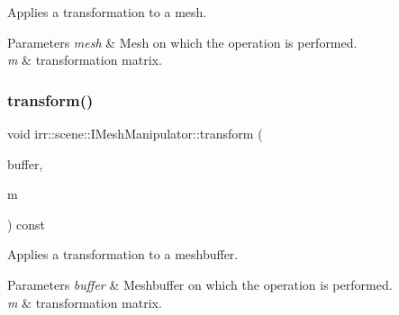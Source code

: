 Applies a transformation to a mesh. 


\begin{DoxyParams}{Parameters}
{\em mesh} & Mesh on which the operation is performed. \\
\hline
{\em m} & transformation matrix. \\
\hline
\end{DoxyParams}
\mbox{\label{classirr_1_1scene_1_1IMeshManipulator_a14dc2101f7facaddec49f59ed363bbc1}} 
\subsubsection{\texorpdfstring{transform()}{transform()}\hspace{0.1cm}{\footnotesize\ttfamily [2/2]}}
{\footnotesize\ttfamily void irr\+::scene\+::\+I\+Mesh\+Manipulator\+::transform (\begin{DoxyParamCaption}\item[{\hyperlink{classirr_1_1scene_1_1IMeshBuffer}{I\+Mesh\+Buffer} $\ast$}]{buffer,  }\item[{const \hyperlink{namespaceirr_1_1core_a73fa92e638c5ca97efd72da307cc9b65}{core\+::matrix4} \&}]{m }\end{DoxyParamCaption}) const\hspace{0.3cm}{\ttfamily [inline]}}



Applies a transformation to a meshbuffer. 


\begin{DoxyParams}{Parameters}
{\em buffer} & Meshbuffer on which the operation is performed. \\
\hline
{\em m} & transformation matrix. \\
\hline
\end{DoxyParams}
\mbox{\label{classirr_1_1scene_1_1IMeshManipulator_a10e09e28622a5d1f5fd0f3a65fd2cb5b}} 
